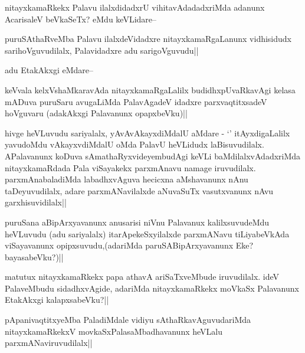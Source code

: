 \begin{artha}
nitayxkamaRkekx Palavu ilalxdidadxrU vihitavAdadadxriMda adanunx AcarisaleV beVkaSeTx? eMdu keVLidare--
\end{artha}

\begin{artha}
puruSAthaRveMba Palavu ilalxdeVidadxre nitayxkamaRgaLanunx vidhisidudx sarihoVguvudilalx, Palavidadxre adu sarigoVguvudu||
\end{artha}

\begin{artha}
adu EtakAkxgi eMdare--
\end{artha}

\begin{artha}
keVvala kelxVshaMkaravAda  nitayxkamaRgaLalilx budidhxpUvaRkavAgi kelasa mADuva puruSaru avugaLiMda PalavAgadeV idadxre parxvaqtitxsadeV hoVguvaru (adakAkxgi Palavanunx opapxbeVku)||
\end{artha}


\begin{artha}
hivge heVLuvudu sariyalalx, yAvAvAkayxdiMdalU aMdare - `\stext' itAyxdigaLalilx yavudoMdu vAkayxvdiMdalU oMda PalavU heVLidudx laBisuvudilalx. APalavanunx koDuva sAmathaRyxvideyembudAgi keVLi baMdilalxvAdadxriMda nitayxkamaRdada Pala viSayakekx parxmAnavu namage iruvudilalx. parxmAnabaladiMda labadhxvAguva hecicxna aMshavanunx nAnu taDeyuvudilalx, adare parxmANavilalxde aNuvaSuTx vasutxvanunx nAvu garxhisuvidilalx||
\end{artha}

\begin{artha}
puruSana aBipArxyavanunx anusarisi niVnu Palavanux kalilxsuvudeMdu heVLuvudu (adu 
sariyalalx) itarApekeSxyilalxde parxmANavu tiLiyabeVkAda viSayavanunx 
opipxsuvudu,(adariMda paruSABipArxyavanunx Eke?bayasabeVku?)||
\end{artha}

\begin{artha}
matutux nitayxkamaRkekx papa athavA ariSaTxveMbude iruvudilalx. ideV PalaveMbudu sidadhxvAgide, adariMda nitayxkamaRkekx moVkaSx Palavanunx EtakAkxgi kalapxsabeVku?||
\end{artha}

\begin{artha}
pApanivaqtitxyeMba PaladiMdale vidiyu sAthaRkavAguvudariMda nitayxkamaRkekxV movkaSxPalasaMbadhavanunx heVLalu parxmANaviruvudilalx||
\end{artha}

